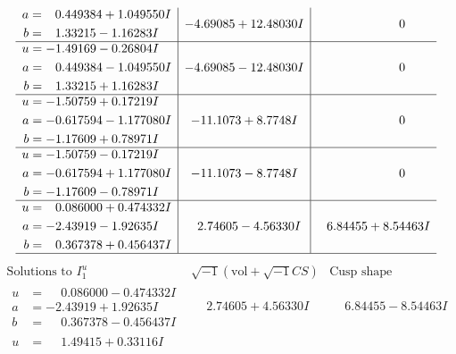 \documentclass[1p]{elsarticle_modified}
\theoremstyle{definition}
\newcommand{\I}{\sqrt{-1}}
\begin{document}
$$\begin{array}{c|c|c}
\begin{aligned}
a &= \phantom{-}0.449384 + 1.049550 I \\
b &= \phantom{-}1.33215 - 1.16283 I\end{aligned}
 & -4.69085 + 12.48030 I & \phantom{-0.000000 } 0 \\ \hline\begin{aligned}
u &= -1.49169 - 0.26804 I \\
a &= \phantom{-}0.449384 - 1.049550 I \\
b &= \phantom{-}1.33215 + 1.16283 I\end{aligned}
 & -4.69085 - 12.48030 I & \phantom{-0.000000 } 0 \\ \hline\begin{aligned}
u &= -1.50759 + 0.17219 I \\
a &= -0.617594 - 1.177080 I \\
b &= -1.17609 + 0.78971 I\end{aligned}
 & -11.1073 + 8.7748 I & \phantom{-0.000000 } 0 \\ \hline\begin{aligned}
u &= -1.50759 - 0.17219 I \\
a &= -0.617594 + 1.177080 I \\
b &= -1.17609 - 0.78971 I\end{aligned}
 & -11.1073 - 8.7748 I & \phantom{-0.000000 } 0 \\ \hline\begin{aligned}
u &= \phantom{-}0.086000 + 0.474332 I \\
a &= -2.43919 - 1.92635 I \\
b &= \phantom{-}0.367378 + 0.456437 I\end{aligned}
 & \phantom{-}2.74605 - 4.56330 I & \phantom{-}6.84455 + 8.54463 I\\
 \hline 
 \end{array}$$\newpage$$\begin{array}{c|c|c}  
\text{Solutions to }I^u_{1}& \I (\text{vol} + \sqrt{-1}CS) & \text{Cusp shape}\\
 \hline 
\begin{aligned}
u &= \phantom{-}0.086000 - 0.474332 I \\
a &= -2.43919 + 1.92635 I \\
b &= \phantom{-}0.367378 - 0.456437 I\end{aligned}
 & \phantom{-}2.74605 + 4.56330 I & \phantom{-}6.84455 - 8.54463 I \\ \hline\begin{aligned}
u &= \phantom{-}1.49415 + 0.33116 I \\

\end{aligned}
\end{array}$$
\end{document}
